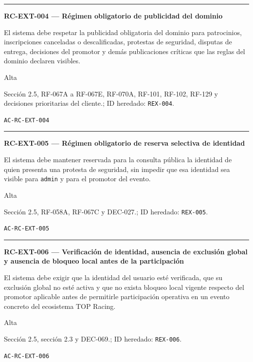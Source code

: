 \documentclass[10pt,letterpaper]{article}
\begin{document}
\vspace{0.25em}\hrule\vspace{0.65em}
\noindent\textbf{RC-EXT-004 --- Régimen obligatorio de publicidad del dominio}\par
\begin{description}[style=nextline,leftmargin=3.15cm,labelwidth=2.8cm,font=\normalfont\bfseries]
\item[Obligación] El sistema debe respetar la publicidad obligatoria del dominio para patrocinios, inscripciones canceladas o descalificadas, protestas de seguridad, disputas de entrega, decisiones del promotor y demás publicaciones críticas que las reglas del dominio declaren visibles.
\item[Prioridad] Alta
\item[Procedencia] Sección 2.5, RF-067A a RF-067E, RF-070A, RF-101, RF-102, RF-129 y decisiones prioritarias del cliente.; ID heredado: \texttt{REX-004}.
\item[Verificación] \texttt{AC-RC-EXT-004}
\end{description}
\vspace{0.25em}\hrule\vspace{0.65em}
\noindent\textbf{RC-EXT-005 --- Régimen obligatorio de reserva selectiva de identidad}\par
\begin{description}[style=nextline,leftmargin=3.15cm,labelwidth=2.8cm,font=\normalfont\bfseries]
\item[Obligación] El sistema debe mantener reservada para la consulta pública la identidad de quien presenta una protesta de seguridad, sin impedir que esa identidad sea visible para \texttt{admin} y para el promotor del evento.
\item[Prioridad] Alta
\item[Procedencia] Sección 2.5, RF-058A, RF-067C y DEC-027.; ID heredado: \texttt{REX-005}.
\item[Verificación] \texttt{AC-RC-EXT-005}
\end{description}
\vspace{0.25em}\hrule\vspace{0.65em}
\noindent\textbf{RC-EXT-006 --- Verificación de identidad, ausencia de exclusión global y ausencia de bloqueo local antes de la participación}\par
\begin{description}[style=nextline,leftmargin=3.15cm,labelwidth=2.8cm,font=\normalfont\bfseries]
\item[Obligación] El sistema debe exigir que la identidad del usuario esté verificada, que su exclusión global no esté activa y que no exista bloqueo local vigente respecto del promotor aplicable antes de permitirle participación operativa en un evento concreto del ecosistema TOP Racing.
\item[Prioridad] Alta
\item[Procedencia] Sección 2.5, sección 2.3 y DEC-069.; ID heredado: \texttt{REX-006}.
\item[Verificación] \texttt{AC-RC-EXT-006}
\end{description}
\end{document}
